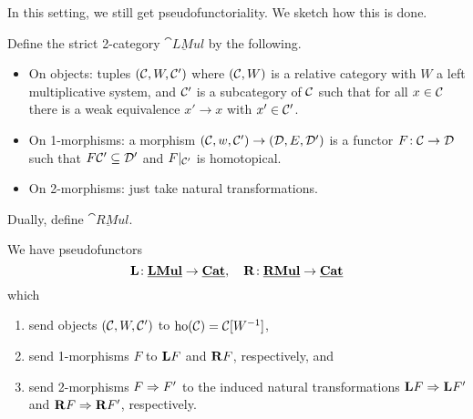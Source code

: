 In this setting, we still get pseudofunctoriality. We sketch how this is done.
\begin{definition}
	Define the strict 2-category \(\underline{\cat{LMul}}\) by the following.
	\begin{itemize}[label=\(\star\)]
	\item On objects: tuples \((\mathcal{C},W,\mathcal{C}')\) where \((\mathcal{C},W)\) is a relative category with \(W\) a left multiplicative system, and \(\mathcal{C}'\) is a subcategory of \(\mathcal{C}\)
	such that for all \(x\in\mathcal{C}\) there is a weak equivalence \(x'\to x\) with \(x'\in\mathcal{C}'\).
	\item On 1-morphisms: a morphism \((\mathcal{C},w,\mathcal{C}')\to(\mathcal{D},E,\mathcal{D}')\) is a functor \(F\!:\mathcal{C}\to\mathcal{D}\) such that \(F\mathcal{C}' \subseteq \mathcal{D}'\) and \(F|_{\mathcal{C}'}\) is homotopical.
	\item On 2-morphisms: just take natural transformations.
	\end{itemize}
	Dually, define \(\underline{\cat{RMul}}\).
\end{definition}
\begin{theorem}
	We have pseudofunctors
	\[ \mathbf{L}\!:\underline{\mathbf{LMul}}\to\underline{\mathbf{Cat}},\quad \mathbf{R}\!:\underline{\mathbf{RMul}}\to\underline{\mathbf{Cat}} \]
	which
	\begin{enumerate}[label=(\arabic*)]
	\item send objects \((\mathcal{C},W,\mathcal{C}')\) to \(\operatorname{ho}(\mathcal{C}) = \mathcal{C}[W^{-1}]\),
	\item send 1-morphisms \(F\) to \(\mathbf{L} F\) and \(\mathbf{R} F\), respectively, and
	\item send 2-morphisms \(F\Rightarrow F'\) to the induced natural transformations \(\mathbf{L} F\Rightarrow\mathbf{L} F'\) and \(\mathbf{R} F\Rightarrow\mathbf{R} F'\), respectively.
	\end{enumerate}
\end{theorem}
